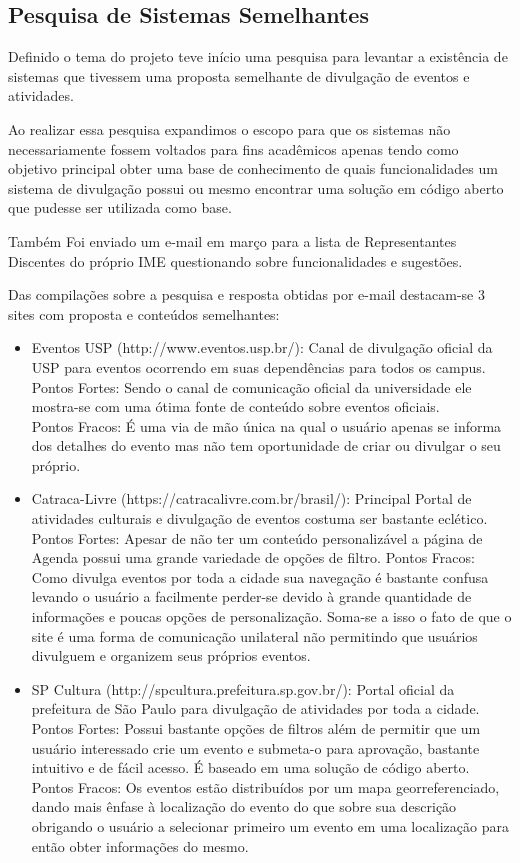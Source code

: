 \subsection{Pesquisa de Sistemas Semelhantes}
\par Definido o tema do projeto teve início uma pesquisa para levantar a existência de sistemas que tivessem uma proposta semelhante de divulgação de eventos e atividades.
\par Ao realizar essa pesquisa expandimos o escopo para que os sistemas não necessariamente fossem voltados para fins acadêmicos apenas tendo como objetivo principal obter uma base de conhecimento de quais funcionalidades um sistema de divulgação possui ou mesmo encontrar uma solução em código aberto que pudesse ser utilizada como base.
 \par Também Foi enviado um e-mail em março para a lista de Representantes Discentes do próprio IME questionando sobre funcionalidades e sugestões.
\par Das compilações sobre a pesquisa e resposta obtidas por e-mail destacam-se 3 sites com proposta e conteúdos semelhantes:
\begin{itemize}
\item{Eventos USP (http://www.eventos.usp.br/):}
Canal de divulgação oficial da USP para eventos ocorrendo em suas dependências para todos os campus.\\
Pontos Fortes: Sendo o canal de comunicação oficial da universidade ele mostra-se com uma ótima fonte de conteúdo sobre eventos oficiais.\\
Pontos Fracos: É uma via de mão única na qual o usuário apenas se informa dos detalhes do evento mas não tem oportunidade de criar ou divulgar o seu próprio.
\item {Catraca-Livre (https://catracalivre.com.br/brasil/):} Principal Portal de atividades culturais e divulgação de eventos costuma ser bastante eclético. \\
Pontos Fortes: Apesar de não ter um conteúdo personalizável a página de Agenda possui uma grande variedade de opções de filtro.
Pontos Fracos: Como divulga eventos por toda a cidade sua navegação é bastante confusa levando o usuário a facilmente perder-se devido à grande quantidade de informações e poucas opções de personalização. Soma-se a isso o fato de que o site é uma forma de comunicação unilateral não permitindo que usuários divulguem e organizem seus próprios eventos.\\
\item {SP Cultura (http://spcultura.prefeitura.sp.gov.br/):} Portal oficial da prefeitura de São Paulo para divulgação de atividades por toda a cidade.
Pontos Fortes: Possui bastante opções de filtros além de permitir que um usuário interessado crie um evento e submeta-o para aprovação, bastante intuitivo e de fácil acesso. É baseado em uma solução de código aberto.
Pontos Fracos: Os eventos estão distribuídos por um mapa georreferenciado, dando mais ênfase à localização do evento do que sobre sua descrição obrigando o usuário a selecionar primeiro um evento em uma localização para então obter informações do mesmo.
\end{itemize}

